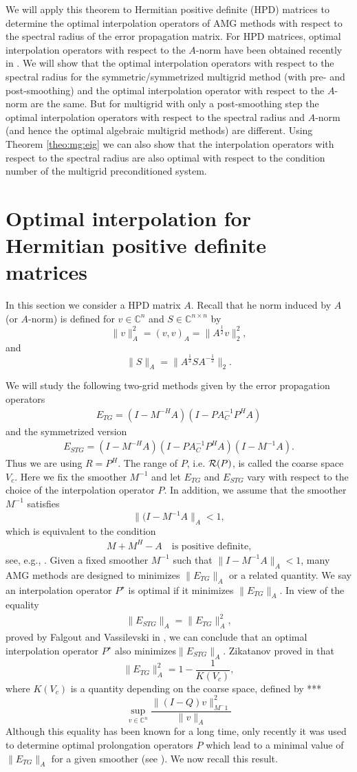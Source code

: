 \documentclass[final]{siamltex}
\newcommand{\uha}{^{\frac{1}{2}}}
\newcommand{\umha}{^{-\frac{1}{2}}}
\newcommand{\beq}{\begin{eqnarray}}
\newcommand{\eeq}{\end{eqnarray}}
\numberwithin{equation}{section}
\newcommand{\ran} {{\cal R}}
\newcommand{\bCn}{\mathbb{C}^n}
\newcommand{\Cn}{\mathbb{C}^n}
\newcommand{\Cnn}{\mathbb{C}^{n \times n}}
\begin{document}
We will apply this theorem to Hermitian positive definite (HPD)  matrices to
determine
the
optimal interpolation operators of AMG methods with respect to
the
spectral radius of the error propagation matrix.
For HPD 
matrices, optimal interpolation  operators with respect to the
$A$-norm have been obtained recently in \cite{XuZ17, Bra18}.
We will show that the optimal interpolation operators with respect to the
spectral
radius
for
the
symmetric/symmetrized
multigrid
method
(with
pre-
and
post-smoothing) and
the
optimal
interpolation operator with respect to the $A$-norm are the same. But for
multigrid
with
only
a
post-smoothing step
the optimal interpolation operators with respect to the spectral radius and
$A$-norm
(and
hence
the
optimal
algebraic
multigrid
methods)
are  different. Using Theorem \ref{theo:mg:eig} we can also show that the 
interpolation operators with respect to the spectral radius are also optimal 
with
respect to the condition number of the multigrid preconditioned system. 

\section{Optimal interpolation  for Hermitian positive definite matrices}

In this section  we  consider a HPD matrix $A$. Recall that he norm induced by
$A$ (or $A$-norm) is defined for $v \in \bCn$ and $S
\in \Cnn$ by
\[
\| v \|_A^2 = (v,v)_A = \|A\uha v\|_2^2,
\]
and 
\[
\| S \|_A = \|A\uha S A\umha\|_2.
\]

We will study the  following two-grid  methods given by the error
propagation
operators
\beq \label{mge}
E_{TG} = (I-M^{-H}A)(I -  PA_C^{-1}P^HA)
\eeq
 and the symmetrized version
\beq \label{smge}
E_{STG} = (I-M^{-H}A)(I -  PA_C^{-1}P^HA)(I-M^{-1}A).
\eeq
Thus we are using $R = P^H$. The range of $P$,
i.e.
$\ran
(P)$,
is
called
the
coarse space $V_c$.
Here   we fix  the smoother $M^{-1}$ and let $E_{TG}$ and $E_{STG}$ vary with
respect  to the choice of the interpolation operator $P$. In addition, we
assume that the smoother
$M^{-1}$
satisfies 
\[
 \|(I-M^{-1}A \|_A < 1,
\]
which is equivalent to the condition
\beq \label{eq:pos}
M +  M^{H} - A  \quad \mbox{is  positive definite,} 
\eeq
see, e.g., \cite{Vas08}. Given a fixed  smoother $M^{-1}$ such that $\|
I-M^{-1}A\|_A < 1$, many AMG
methods are designed to minimizes $ \|E_{TG}\|_A$ or a related quantity. We
say an interpolation operator $P^\star$ is optimal
if it minimizes  $ \|E_{TG}\|_A$. In
view of the equality
\beq \label{normeq}
\|E_{STG}\|_A = \|E_{TG}\|_A^2,
\eeq
proved by 
Falgout
and Vassilevski in
\cite{FalV04}, we can conclude that an optimal interpolation operator
$P^\star$  
also minimizes$ \|E_{STG}\|_A$. Zikatanov
proved in \cite[Lemma 2.3]{Zik08} that
\[
 \|E_{TG}\|_A^2 = 1 - \frac{1}{K(V_c)},
\]
where  $ K(V_c)$ is  a  quantity  depending  on the  coarse space, defined by
***
\[ \sup_{v \in \Cn} \frac{\|(I-Q)v\|_{M^-1}^2}{\|v\|_A} \]
Although  this 
equality has been known for a long time, only  recently it was used to
determine
optimal prolongation operators $P$  which lead   to a minimal  value of
$\|E_{TG}\|_A$ for a given smoother (see \cite{XuZ17, Bra18}). We now recall
this result.
\end{document}
